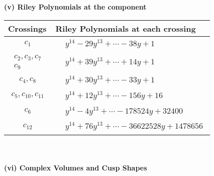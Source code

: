 \documentclass[1p]{elsarticle_modified}
\theoremstyle{definition}
\begin{document}
\newpage\renewcommand{\arraystretch}{1}
\flushleft \textbf{(v) Riley Polynomials at the component}\newline \\
\begin{tabular}{m{50pt}|m{274pt}}
Crossings & \hspace{64pt}Riley Polynomials at each crossing \\
\hline $$\begin{aligned}c_{1}\end{aligned}$$&$\begin{aligned}
&y^{14}-29 y^{13}+\cdots-38 y+1
\end{aligned}$\\
\hline $$\begin{aligned}c_{2},c_{3},c_{7}\\c_{9}\end{aligned}$$&$\begin{aligned}
&y^{14}+39 y^{13}+\cdots+14 y+1
\end{aligned}$\\
\hline $$\begin{aligned}c_{4},c_{8}\end{aligned}$$&$\begin{aligned}
&y^{14}+30 y^{13}+\cdots-33 y+1
\end{aligned}$\\
\hline $$\begin{aligned}c_{5},c_{10},c_{11}\end{aligned}$$&$\begin{aligned}
&y^{14}+12 y^{13}+\cdots-156 y+16
\end{aligned}$\\
\hline $$\begin{aligned}c_{6}\end{aligned}$$&$\begin{aligned}
&y^{14}-4 y^{13}+\cdots-178524 y+32400
\end{aligned}$\\
\hline $$\begin{aligned}c_{12}\end{aligned}$$&$\begin{aligned}
&y^{14}+76 y^{13}+\cdots-36622528 y+1478656
\end{aligned}$\\
\hline
\end{tabular}\\~\\
\newpage\flushleft \textbf{(vi) Complex Volumes and Cusp Shapes}
\end{document}
